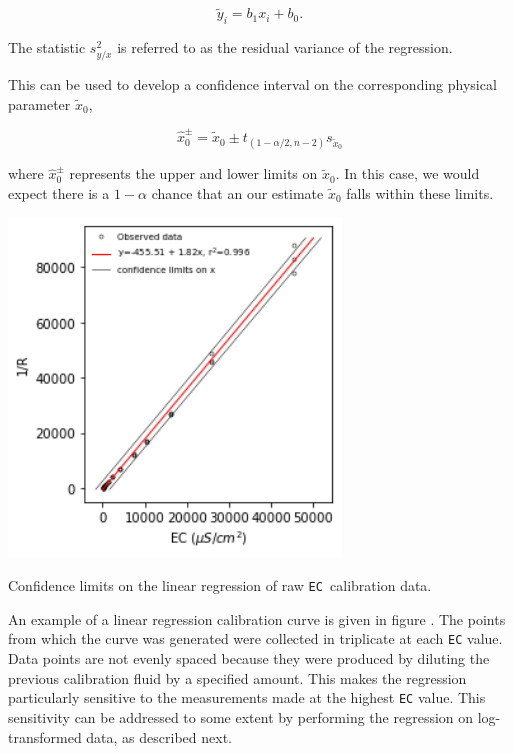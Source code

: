 \begin{equation}\label{eq:linear}
	\tilde{y}_i=b_1 x_i +b_0.  
\end{equation}

The statistic $s_{y/x}^2$ is referred to as the residual variance of the regression. 

This can be used to develop a confidence interval on the corresponding physical parameter $\tilde{x}_0$, 

\begin{equation}\label{eq:confidence}
	\hat{x}_0^\pm = \tilde{x}_0 \pm t_{({1-\alpha/2,n-2})}s_{\tilde{x}_0}
\end{equation}

where $\hat{x}_0^\pm$ represents the upper and lower limits on $\tilde{x}_0$.  In this case, we would expect there is a $1-\alpha$ chance that an our estimate $\tilde{x}_0$ falls within these limits.

\begin{marginfigure}[0cm]
	\begin{center}
		\includegraphics[height=9cm]{Images/linear_confidence.png}
		\caption[Confidence Limits on Linear Regression]{Confidence limits on the linear regression of raw \texttt{EC }calibration data.}
	\end{center}
\end{marginfigure}

An example of a linear regression calibration curve is given in figure . The points from which the curve was generated were collected in triplicate at each \texttt{EC} value.  Data points are not evenly spaced because they were produced by diluting the previous calibration fluid by a specified amount.  This makes the regression particularly sensitive to the measurements made at the highest \texttt{EC} value. This sensitivity can be addressed to some extent by performing the regression on log-transformed data, as described next.

